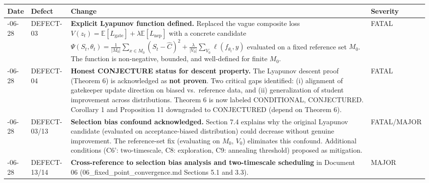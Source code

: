 \documentclass[
  12pt,
]{article}
\begin{document}
\begin{longtable}[]{@{}
  >{\raggedright\arraybackslash}p{}
  >{\raggedright\arraybackslash}p{}
  >{\raggedright\arraybackslash}p{}
  >{\raggedright\arraybackslash}p{}@{}}
\toprule\noalign{}
\begin{minipage}[b]{\linewidth}\raggedright
Date
\end{minipage} & \begin{minipage}[b]{\linewidth}\raggedright
Defect
\end{minipage} & \begin{minipage}[b]{\linewidth}\raggedright
Change
\end{minipage} & \begin{minipage}[b]{\linewidth}\raggedright
Severity
\end{minipage} \\
\midrule\noalign{}
\endhead
\bottomrule\noalign{}
\endlastfoot
2026-06-28 & DEFECT-03 & \textbf{Explicit Lyapunov function defined.}
Replaced the vague composite loss
\(V(z_t) = \mathbb{E}[L_{\text{gate}}] + \lambda \mathbb{E}[L_{\text{nep}}]\)
with a concrete candidate
\(\Psi(S_t, \theta_t) = \frac{1}{|M_0|}\sum_{x \in M_0}(S_t - \hat{C})^2 + \frac{\lambda}{|V_0|}\sum_{V_0}\ell(f_{\theta_t}, y)\)
evaluated on a fixed reference set \(M_0\). The function is
non-negative, bounded, and well-defined for finite \(M_0\). & FATAL \\
2026-06-28 & DEFECT-04 & \textbf{Honest CONJECTURE status for descent
property.} The Lyapunov descent proof (Theorem 6) is acknowledged as
\textbf{not proven}. Two critical gaps identified: (i) alignment of
gatekeeper update direction on biased vs.~reference data, and (ii)
generalization of student improvement across distributions. Theorem 6 is
now labeled CONDITIONAL, CONJECTURED. Corollary 1 and Proposition 11
downgraded to CONJECTURED (depend on Theorem 6). & FATAL \\
2026-06-28 & DEFECT-03/13 & \textbf{Selection bias confound
acknowledged.} Section 7.4 explains why the original Lyapunov candidate
(evaluated on acceptance-biased distribution) could decrease without
genuine improvement. The reference-set fix (evaluating on \(M_0\),
\(V_0\)) eliminates this confound. Additional conditions (C6':
two-timescale, C8: exploration, C9: annealing threshold) proposed as
mitigation. & FATAL/MAJOR \\
2026-06-28 & DEFECT-13/14 & \textbf{Cross-reference to selection bias
analysis and two-timescale scheduling} in Document 06
(06\_fixed\_point\_convergence.md Sections 5.1 and 3.3). & MAJOR \\
\end{longtable}
\end{document}
